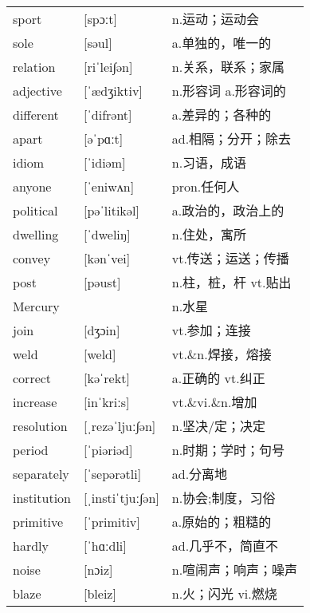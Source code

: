 \documentclass[a4paper]{article}
\begin{document}
\section{}
\begin{tabular}{l l l}

sport & [spɔːt] & n.运动；运动会 \\
sole & [səul] & a.单独的，唯一的 \\
relation & [riˈlei∫ən] & n.关系，联系；家属 \\
adjective & [ˈædʒiktiv] & n.形容词 a.形容词的 \\
different & [ˈdifrənt] & a.差异的；各种的 \\
apart & [əˈpɑːt] & ad.相隔；分开；除去 \\
idiom & [ˈidiəm] & n.习语，成语 \\
anyone & [ˈeniwʌn] & pron.任何人 \\
political & [pəˈlitikəl] & a.政治的，政治上的 \\
dwelling & [ˈdweliŋ] & n.住处，寓所 \\
convey & [kənˈvei] & vt.传送；运送；传播 \\
post & [pəust] & n.柱，桩，杆 vt.贴出 \\
Mercury &  & n.水星 \\
join & [dʒɔin] & vt.参加；连接 \\
weld & [weld] & vt.\&n.焊接，熔接 \\
correct & [kəˈrekt] & a.正确的 vt.纠正 \\
increase & [inˈkriːs] & vt.\&vi.\&n.增加 \\
resolution & [ˌrezəˈljuː∫ən] & n.坚决/定；决定 \\
period & [ˈpiəriəd] & n.时期；学时；句号 \\
separately & [ˈsepərətli] & ad.分离地 \\
institution & [ˌinstiˈtjuː∫ən] & n.协会;制度，习俗 \\
primitive & [ˈprimitiv] & a.原始的；粗糙的 \\
hardly & [ˈhɑːdli] & ad.几乎不，简直不 \\
noise & [nɔiz] & n.喧闹声；响声；噪声 \\
blaze & [bleiz] & n.火；闪光 vi.燃烧 \\

\end{tabular}
\end{document}
